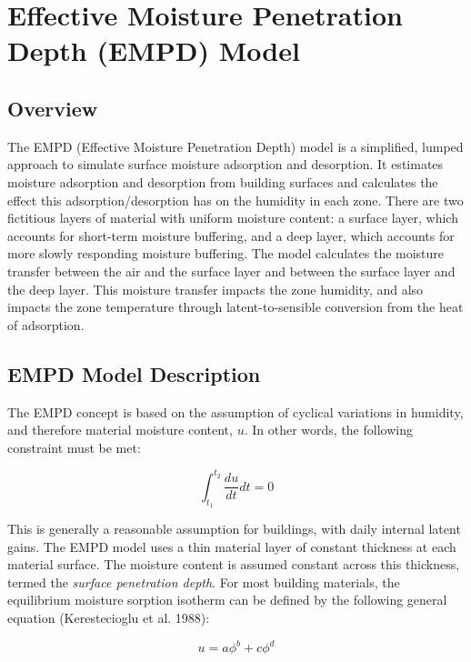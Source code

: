 \section{Effective Moisture Penetration Depth (EMPD) Model}\label{effective-moisture-penetration-depth-empd-model}

\subsection{Overview}\label{overview-014}

The EMPD (Effective Moisture Penetration Depth) model is a simplified, lumped approach to simulate surface moisture adsorption and desorption. It estimates moisture adsorption and desorption from building surfaces and calculates the effect this adsorption/desorption has on the humidity in each zone. There are two fictitious layers of material with uniform moisture content: a surface layer, which accounts for short-term moisture buffering, and a deep layer, which accounts for more slowly responding moisture buffering. The model calculates the moisture transfer between the air and the surface layer and between the surface layer and the deep layer. This moisture transfer impacts the zone humidity, and also impacts the zone temperature through latent-to-sensible conversion from the heat of adsorption.

\subsection{EMPD Model Description}\label{empd-model-description}

The EMPD concept is based on the assumption of cyclical variations in humidity, and therefore material moisture content, \(u\). In other words, the following constraint must be met:

\begin{equation}
\int_{{t_1}}^{{t_2}} {\frac{{du}}{{dt }}} dt  = 0
\end{equation}

This is generally a reasonable assumption for buildings, with daily internal latent gains. The EMPD model uses a thin material layer of constant thickness at each material surface. The moisture content is assumed constant across this thickness, termed the \emph{surface penetration depth}. For most building materials, the equilibrium moisture sorption isotherm can be defined by the following general equation (Kerestecioglu et al. 1988):

\begin{equation}
u = a \phi^b + c \phi^d
\end{equation}


